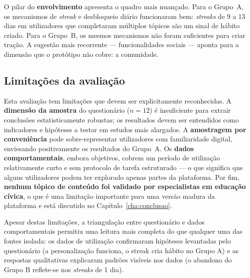 O pilar do \textbf{envolvimento} apresenta o quadro mais nuançado. Para o Grupo~A, os mecanismos de \emph{streak} e desbloqueio diário funcionaram bem: \emph{streaks} de 9 a 13 dias em utilizadores que completaram múltiplos tópicos são um sinal de hábito criado. Para o Grupo~B, os mesmos mecanismos não foram suficientes para criar tração. A sugestão mais recorrente --- funcionalidades sociais --- aponta para a dimensão que o protótipo não cobre: a comunidade.

\subsection*{Limitações da avaliação}
\label{sec:limitacoes-avaliacao}

Esta avaliação tem limitações que devem ser explicitamente reconhecidas. A \textbf{dimensão da amostra} do questionário ($n=12$) é insuficiente para extrair conclusões estatisticamente robustas; os resultados devem ser entendidos como indicadores e hipóteses a testar em estudos mais alargados. A \textbf{amostragem por conveniência} pode sobre-representar utilizadores com familiaridade digital, enviesando positivamente os resultados do Grupo~A. Os \textbf{dados comportamentais}, embora objetivos, cobrem um período de utilização relativamente curto e sem protocolo de tarefa estruturado --- o que significa que alguns utilizadores podem ter explorado apenas partes da plataforma. Por fim, \textbf{nenhum tópico de conteúdo foi validado por especialistas em educação cívica}, o que é uma limitação importante para uma versão madura da plataforma e está discutido no Capítulo~\ref{cha:conclusao}.

Apesar destas limitações, a triangulação entre questionário e dados comportamentais permitiu uma leitura mais completa do que qualquer uma das fontes isolada: os dados de utilização confirmaram hipóteses levantadas pelo questionário (a personalização funciona, o streak cria hábito no Grupo A) e as respostas qualitativas explicaram padrões visíveis nos dados (o abandono do Grupo B reflete-se nos \emph{streaks} de 1 dia).
